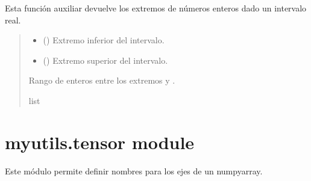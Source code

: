 \documentclass[letterpaper,10pt,english]{sphinxmanual}
\begin{document}
\begin{fulllineitems}
\label{\detokenize{myutils:myutils.stats.intervalo_int}}
\pysigstartsignatures
{}
\pysigstopsignatures
\sphinxAtStartPar
Esta función auxiliar devuelve los extremos de números enteros dado un intervalo real.
\begin{quote}\begin{description}
\begin{itemize}
\item {} 
\sphinxAtStartPar
{} () \textendash{} Extremo inferior del intervalo.

\item {} 
\sphinxAtStartPar
{} () \textendash{} Extremo superior del intervalo.

\end{itemize}

\sphinxAtStartPar
Rango de enteros entre los extremos  y .

\sphinxAtStartPar
list

\end{description}\end{quote}

\end{fulllineitems}



\section{myutils.tensor module}
\label{\detokenize{myutils:module-myutils.tensor}}\label{\detokenize{myutils:myutils-tensor-module}}
\sphinxAtStartPar
Este módulo permite definir nombres para los ejes
de un numpyarray.
\end{document}
